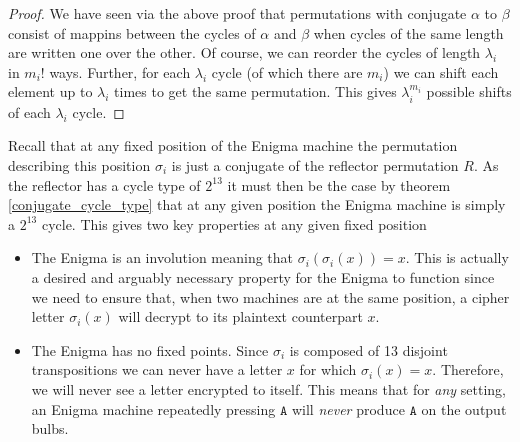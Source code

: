 \begin{proof}
	We have seen via the above proof that permutations with conjugate $\alpha$ to $\beta$ consist of mappins between the cycles of $\alpha$ and $\beta$ when cycles of the same length are written one over the other. Of course, we can reorder the cycles of length $\lambda_i$ in $m_i!$ ways. Further, for each $\lambda_i$ cycle (of which there are $m_i$) we can shift each element up to $\lambda_i$ times to get the same permutation. This gives $\lambda_i^{m_i}$ possible shifts of each $\lambda_i$ cycle.
\end{proof}
Recall that at any fixed position of the Enigma machine the permutation describing this position $\sigma_i$ is just a conjugate of the reflector permutation $R$. As the reflector has a cycle type of $2^{13}$ it must then be the case by theorem \ref{conjugate_cycle_type} that at any given position the Enigma machine is simply a $2^{13}$ cycle. This gives two key properties at any given fixed position
\begin{itemize}
	\item The Enigma is an involution meaning that $\sigma_i(\sigma_i(x)) = x$. This is actually a desired and arguably necessary property for the Enigma to function since we need to ensure that, when two machines are at the same position, a cipher letter $\sigma_i(x)$ will decrypt to its plaintext counterpart $x$.
	\item The Enigma has no fixed points. Since $\sigma_i$ is composed of 13 disjoint transpositions we can never have a letter $x$ for which $\sigma_i(x) = x$. Therefore, we will never see a letter encrypted to itself. This means that for \emph{any} setting, an Enigma machine repeatedly pressing $\texttt{A}$ will \emph{never} produce $\texttt{A}$ on the output bulbs.
\end{itemize}

